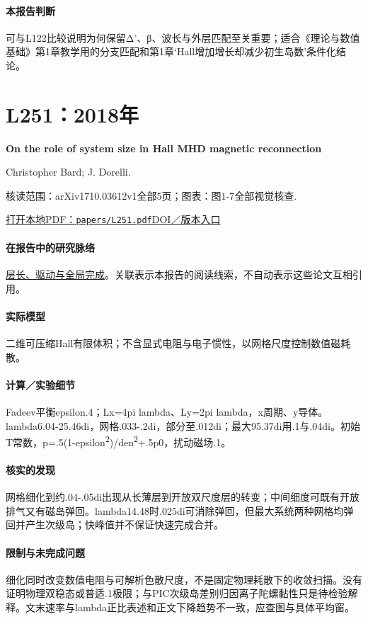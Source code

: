 \documentclass[UTF8,a4paper,11pt,openany,fontset=fandol]{ctexbook}
\begin{document}
\paragraph{本报告判断}可与L122比较说明为何保留Δ'、β、波长与外层匹配至关重要；适合《理论与数值基础》第1章教学用的分支匹配和第1章‘Hall增加增长却减少初生岛数’条件化结论。

\section{L251：2018年}\label{paper:L251}

\textbf{On the role of system size in Hall MHD magnetic reconnection}\citep{L251}\

Christopher Bard;  J. Dorelli.

\textsf{核读范围：}arXiv1710.03612v1全部5页；\textsf{图表：}图1-7全部视觉核查.

\href{run:../papers/L251.pdf}{打开本地PDF：\texttt{papers/L251.pdf}}\quad\href{https://doi.org/10.1063/1.5010785}{DOI／版本入口}

\paragraph{在报告中的研究脉络}\hyperref[story:global]{层长、驱动与全局完成}。关联表示本报告的阅读线索，不自动表示这些论文互相引用。

\paragraph{实际模型}二维可压缩Hall有限体积；不含显式电阻与电子惯性，以网格尺度控制数值磁耗散。

\paragraph{计算／实验细节}Fadeev平衡epsilon.4；Lx=4pi lambda、Ly=2pi lambda，x周期、y导体。lambda6.04-25.46di，网格.033-.2di，部分至.012di；最大95.37di用.1与.04di。初始T常数，p=.5(1-epsilon\textsuperscript{2})/den\textsuperscript{2}+.5p0，扰动磁场.1。

\paragraph{核实的发现}网格细化到约.04-.05di出现从长薄层到开放双尺度层的转变；中间细度可既有开放排气又有磁岛弹回。lambda14.48时.025di可消除弹回，但最大系统两种网格均弹回并产生次级岛；快峰值并不保证快速完成合并。

\paragraph{限制与未完成问题}细化同时改变数值电阻与可解析色散尺度，不是固定物理耗散下的收敛扫描。没有证明物理双稳态或普适.1极限；与PIC次级岛差别归因离子陀螺黏性只是待检验解释。文末速率与lambda正比表述和正文下降趋势不一致，应查图与具体平均窗。
\end{document}
